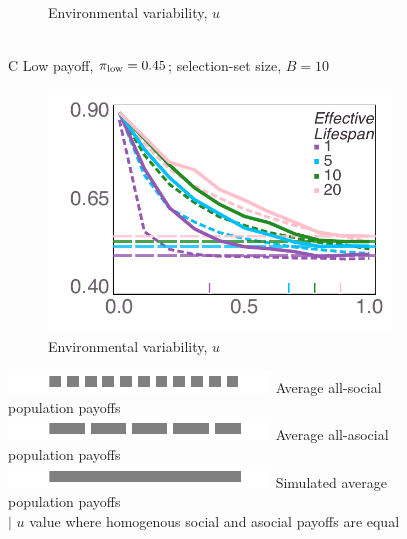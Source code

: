 \documentclass[letterpaper,11.5pt]{scrartcl}
\begin{document}
\begin{figure}
\begin{subfigure}[]{0.4\textwidth}
      \\[-0.8em]
      {\centering \quad Environmental variability, $u$}
    \end{subfigure} \\[1.5em]
    {\textsf C \quad Low payoff, $\pi_{\mathrm{low}} = 0.45$; selection-set size, $B = 10$} \\
    \begin{subfigure}[]{0.4\textwidth}
      \centering
      \includegraphics[width=\textwidth]{Figures/mean_prev_net_payoff_over_u_lowpayoff=0.45_nbehaviors=10.pdf}
      \\[-0.8em]
      {\centering \quad Environmental variability, $u$}

    \end{subfigure}

    \begin{center}
       \includegraphics[width=.75in]{Figures/legendElements/dot.pdf}
       { Average all-social population payoffs}  \\[.725em]
       \includegraphics[width=.75in]{Figures/legendElements/ldash.pdf} 
       { Average all-asocial population payoffs} \\[.725em]
       \includegraphics[width=.75in]{Figures/legendElements/solid.pdf} 
       { Simulated average population payoffs} \\[.725em]
       { $\pmb{|}$  \quad $u$ value where homogenous social and asocial payoffs
      are equal} 
    \end{center}
\end{figure}
\end{document}
